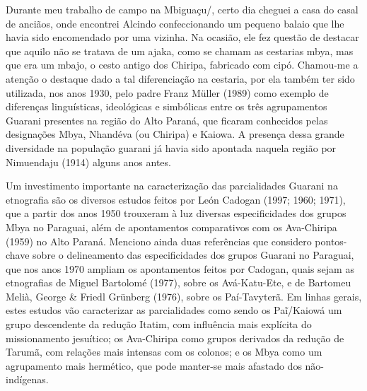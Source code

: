 {{   %
 


Durante meu trabalho de campo na  Mbiguaçu/, certo dia cheguei a
casa do casal de anciãos, onde encontrei Alcindo confeccionando um
pequeno balaio que lhe havia sido encomendado por uma vizinha. Na
ocasião, ele fez questão de destacar que aquilo não se tratava de um
ajaka, como se chamam as cestarias mbya, mas que era um mbajo, o cesto
antigo dos Chiripa, fabricado com cipó. Chamou-me a atenção o destaque
dado a tal diferenciação na cestaria, por ela também ter sido
utilizada, nos anos 1930, pelo padre Franz Müller (1989) como exemplo
de diferenças linguísticas, ideológicas e simbólicas entre os três
agrupamentos Guarani presentes na região do Alto Paraná, que ficaram
conhecidos pelas designações Mbya, Nhandéva (ou Chiripa) e Kaiowa. A
presença dessa grande diversidade na população guarani já havia sido
apontada naquela região por Nimuendaju (1914) alguns anos antes.

Um investimento importante na caracterização das parcialidades Guarani
na etnografia são os diversos estudos feitos por León Cadogan (1997;
1960; 1971), que a partir dos anos 1950 trouxeram à luz diversas
especificidades dos grupos Mbya no Paraguai, além de apontamentos
comparativos com os Ava-Chiripa (1959) no Alto Paraná. Menciono ainda
duas referências que considero pontos-chave sobre o delineamento das
especificidades dos grupos Guarani no Paraguai, que nos anos 1970
ampliam os apontamentos feitos por Cadogan, quais sejam as etnografias
de Miguel Bartolomé (1977), sobre os Avá-Katu-Ete, e de Bartomeu Melià,
George \& Friedl Grünberg (1976), sobre os Paí-Tavyterã. Em linhas
gerais, estes estudos vão caracterizar as parcialidades como sendo os
Paĩ/Kaiowá um grupo descendente da redução
Itatim, com influência mais explícita do missionamento jesuítico; os
Ava-Chiripa como grupos derivados da redução de Tarumã, com relações
mais intensas com os colonos; e os Mbya como um agrupamento mais
hermético, que pode manter-se mais afastado dos não-indígenas. 

}}
